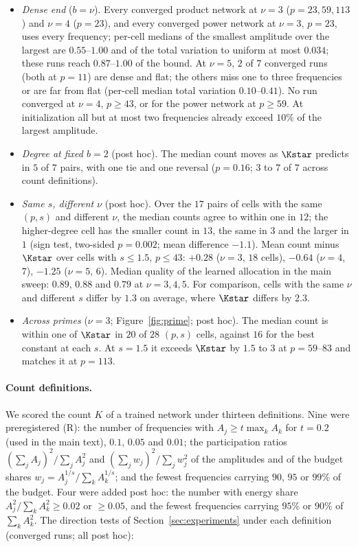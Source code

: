 \begin{itemize}
\item \emph{Dense end} ($b=\nu$). Every converged product network at $\nu=3$ ($p=23,59,113$) and $\nu=4$ ($p=23$), and every converged power network at $\nu=3$, $p=23$, uses every frequency; per-cell medians of the smallest amplitude over the largest are $0.55$--$1.00$ and of the total variation to uniform at most $0.034$; these runs reach $0.87$--$1.00$ of the bound. At $\nu=5$, $2$ of $7$ converged runs (both at $p=11$) are dense and flat; the others miss one to three frequencies or are far from flat (per-cell median total variation $0.10$--$0.41$). No run converged at $\nu=4$, $p\ge43$, or for the power network at $p\ge59$. At initialization all but at most two frequencies already exceed $10\%$ of the largest amplitude.
\item \emph{Degree at fixed $b=2$} (post hoc). The median count moves as $\Kstar$ predicts in $5$ of $7$ pairs, with one tie and one reversal ($p=0.16$; $3$ to $7$ of $7$ across count definitions).
\item \emph{Same $s$, different $\nu$} (post hoc). Over the $17$ pairs of cells with the same $(p,s)$ and different $\nu$, the median counts agree to within one in $12$; the higher-degree cell has the smaller count in $13$, the same in $3$ and the larger in $1$ (sign test, two-sided $p=0.002$; mean difference $-1.1$). Mean count minus $\Kstar$ over cells with $s\le1.5$, $p\le43$: $+0.28$ ($\nu=3$, $18$ cells), $-0.64$ ($\nu=4$, $7$), $-1.25$ ($\nu=5$, $6$). Median quality of the learned allocation in the main sweep: $0.89$, $0.88$ and $0.79$ at $\nu=3,4,5$. For comparison, cells with the same $\nu$ and different $s$ differ by $1.3$ on average, where $\Kstar$ differs by $2.3$.
\item \emph{Across primes} ($\nu=3$; Figure~\ref{fig:prime}; post hoc). The median count is within one of $\Kstar$ in $20$ of $28$ $(p,s)$ cells, against $16$ for the best constant at each $s$. At $s=1.5$ it exceeds $\Kstar$ by $1.5$ to $3$ at $p=59$--$83$ and matches it at $p=113$.
\end{itemize}

\paragraph{Count definitions.} We scored the count $K$ of a trained network under thirteen definitions. Nine were preregistered (R): the number of frequencies with $A_j\ge t\max_kA_k$ for $t=0.2$ (used in the main text), $0.1$, $0.05$ and $0.01$; the participation ratios $(\sum_jA_j)^2/\sum_jA_j^2$ and $(\sum_jw_j)^2/\sum_jw_j^2$ of the amplitudes and of the budget shares $w_j=A_j^{1/s}/\sum_kA_k^{1/s}$; and the fewest frequencies carrying $90$, $95$ or $99\%$ of the budget. Four were added post hoc: the number with energy share $A_j^2/\sum_kA_k^2\ge0.02$ or $\ge0.05$, and the fewest frequencies carrying $95\%$ or $90\%$ of $\sum_kA_k^2$. The direction tests of Section~\ref{sec:experiments} under each definition (converged runs; all post hoc):

